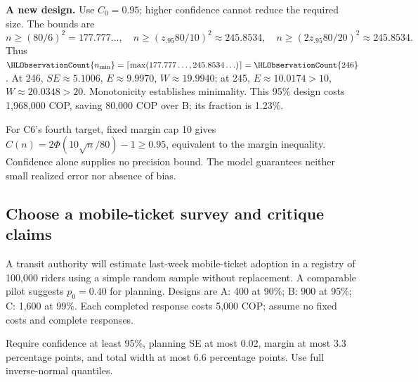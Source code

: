 \textbf{A new design.} Use $C_0=0.95$; higher confidence cannot reduce the required size. The bounds are
\[n\ge(80/6)^2=177.777\ldots,\quad
n\ge(z_{.95}80/10)^2\approx245.8534,\quad
n\ge(2z_{.95}80/20)^2\approx245.8534.\]
Thus $\HLObservationCount{n_{\min}}=\lceil\max(177.777\ldots,245.8534\ldots)\rceil=\HLObservationCount{246}$. At 246, $SE\approx5.1006$, $E\approx9.9970$, $W\approx19.9940$; at 245, $E\approx10.0174>10$, $W\approx20.0348>20$. Monotonicity establishes minimality. This 95\% design costs 1,968,000 COP, saving 80,000 COP over B; its fraction is 1.23\%.

For C6's fourth target, fixed margin cap 10 gives $C(n)=2\Phi(10\sqrt n/80)-1\ge0.95$, equivalent to the margin inequality. Confidence alone supplies no precision bound. The model guarantees neither small realized error nor absence of bias.
\clearpage
\subsection{Choose a mobile-ticket survey and critique claims}\label{prob:c7-advanced-prop}
A transit authority will estimate last-week mobile-ticket adoption in a registry of 100,000 riders using a simple random sample without replacement. A comparable pilot suggests $p_0=0.40$ for planning. Designs are A: 400 at 90\%; B: 900 at 95\%; C: 1,600 at 99\%. Each completed response costs 5,000 COP; assume no fixed costs and complete responses.

Require confidence at least 95\%, planning SE at most 0.02, margin at most 3.3 percentage points, and total width at most 6.6 percentage points. Use full inverse-normal quantiles.
